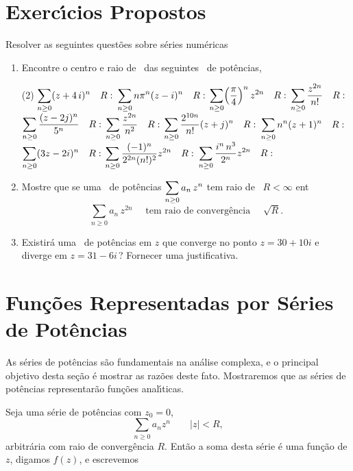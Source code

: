 \section*{Exerc\'{\i}cios Propostos} 
Resolver as seguintes quest\~{o}es sobre s\'{e}ries num\'{e}ricas
\begin{enumerate}[label=\rm{(\arabic*)}]
\item Encontre o centro e raio de \conver\ das seguintes \sers\ de pot\^{e}ncias,
\begin{tasks}[label=\rm{(\alph*)},item-indent=4em, label-width=4ex,ref=\rm{(\alph*)}](2)
\task  \(\displaystyle \sum_{n\geq 0}(z+4\,i)^n \quad  R:\)
\task  \(\displaystyle \sum_{n\geq 0}n\pi^n(z-i)^n \quad  R:\)
\task  \(\displaystyle \sum_{n\geq 0}\Bigl(\frac{\pi}{4}\Bigr)^n\,z^{2n}\quad  R:\)
\task  \(\displaystyle \sum_{n\geq 0}\dfrac{z^{2n}}{n!}\quad R:\)
\task  \(\displaystyle \sum_{n\geq 0}\dfrac{(z-2j)^n}{5^n} \quad  R: \)
\task  \(\displaystyle \sum_{n\geq 0}\dfrac{z^{2n}}{n^2} \quad  R:\)
\task  \(\displaystyle \sum_{n\geq 0}\dfrac{2^{10n}}{n!}(z+j)^n\quad R: \)
\task  \(\displaystyle \sum_{n\geq 0}n^n(z+1)^n \quad  R:\)
\task  \(\displaystyle \sum_{n\geq 0}(3z-2i)^n \quad  R: \)
\task  \(\displaystyle \sum_{n\geq 0}\dfrac{(-1)^n}{2^{2n}(n!)^2}z^{2n}\quad  R:\)
\task  \(\displaystyle \sum_{n\geq 0}\dfrac{i^n\,n^3}{2^n}z^{2n}\quad  R:\)
\end{tasks}
\item Mostre que se uma \ser\ de pot\^{e}ncias $\displaystyle{\sum_{n\geq 0}a_n\,z^{n}}$ tem raio de \conver\ $R<\infty$  ent\ao\
\begin{equation*}
\sum_{n\geq 0}a_n\,z^{2n}\quad \text{ tem raio de converg\^{e}ncia }\quad  \sqrt{R}.
\end{equation*}

\item Existir\'a uma \ser\ de pot\^{e}ncias em $z$ que converge no ponto $z=30+10i$ e diverge 
em $z=31-6i$\,?  Fornecer uma justificativa.
\end{enumerate}

\section{Fun\c{c}\~{o}es Representadas por S\'{e}ries de Pot\^{e}ncias}

As s\'{e}ries de pot\^{e}ncias s\~{a}o fundamentais na an\'{a}lise complexa, e o
principal objetivo desta se\c{c}\~{a}o \'{e} mostrar as raz\~{o}es deste fato.
Mostraremos que as s\'{e}ries de pot\^{e}ncias representar\~{a}o fun\c{c}\~{o}es
anal\'{\i}ticas.

Seja uma s\'{e}rie de pot\^{e}ncias com $z_{0}=0$,
\begin{equation*}
\sum_{n\geq 0}a_nz^n\qquad |z|<R,
\end{equation*}
arbitr\'{a}ria com raio de converg\^{e}ncia $R$. Ent\~{a}o a soma desta s\'{e}rie
\'{e} uma fun\c{c}\~{a}o de $z$, digamos $f(z)$, e escrevemos

